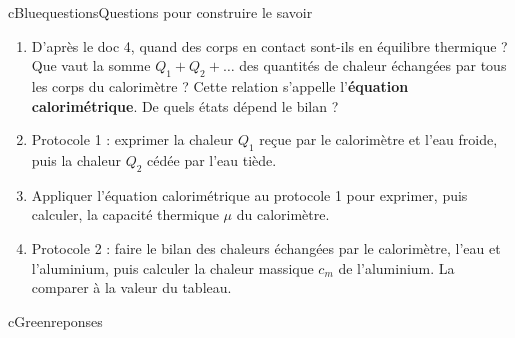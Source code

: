 \begin{rub}{cBlue}{questions}{Questions pour construire le savoir}
\begin{enumerate}
  \item {} D’après le doc 4, quand des corps en contact sont-ils en équilibre thermique ? Que vaut la somme $Q_1 + Q_2 + \dots$ des quantités de chaleur échangées par tous les corps du calorimètre ? Cette relation s’appelle l’\textbf{équation calorimétrique}. De quels états dépend le bilan ?
  \item {} Protocole 1 : exprimer la chaleur $Q_1$ reçue par le calorimètre et l’eau froide, puis la chaleur $Q_2$ cédée par l’eau tiède.
  \item {} Appliquer l’équation calorimétrique au protocole 1 pour exprimer, puis calculer, la capacité thermique $\mu$ du calorimètre.
  \item {} Protocole 2 : faire le bilan des chaleurs échangées par le calorimètre, l’eau et l’aluminium, puis calculer la chaleur massique $c_m$ de l’aluminium. La comparer à la valeur du tableau.
\end{enumerate}
\end{rub}

\begin{rub}{cGreen}{reponses}{\titrereponses}
\begin{reps}
  \item {}
  \item {}
  \item {}
  \item {}
\end{reps}
\end{rub}

